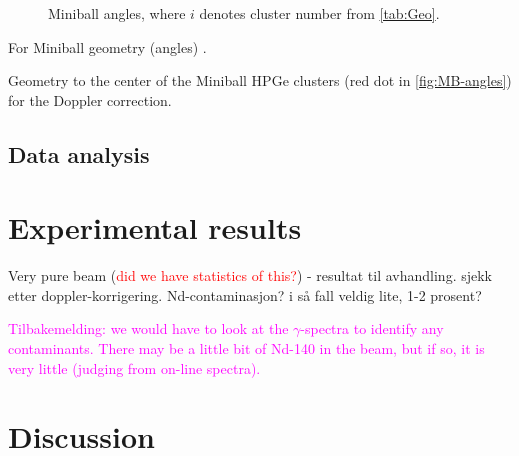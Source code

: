 \documentclass[twoside,english]{uiofysmaster/uiofysmaster}
\newcommand{\ga}{$\gamma$}
\begin{document}
\bigskip

\begin{figure}[ht]
	\centering
	
	\caption{Miniball angles, where $i$ denotes cluster number from \autoref{tab:Geo}.}
	\label{fig:MB-angles}
\end{figure}

For Miniball geometry (angles) \cite{NWarr-Angles}. 

\begin{table}[ht] 
	\centering 
	\caption{Geometry to the center of the Miniball HPGe clusters (red dot in \autoref{fig:MB-angles}) for the Doppler correction.}
	
	\label{tab:Geo}
\end{table}




\section{Data analysis}











\chapter{Experimental results}


Very pure beam (\textcolor{red}{did we have statistics of this?}) - resultat til avhandling. sjekk etter doppler-korrigering. Nd-contaminasjon? i så fall veldig lite, 1-2 prosent?

\textcolor{Magenta}{Tilbakemelding: \newline
we would have to look at the \ga-spectra to identify any contaminants. There may be a little bit of Nd-140 in the beam, but if so, it is very little (judging from on-line spectra).}




\chapter{Discussion}
\end{document}
